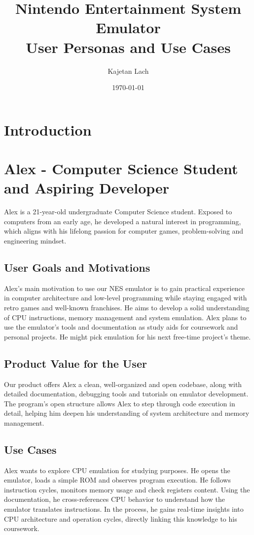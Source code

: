 \documentclass[a4paper, 11pt]{article}
\title{%
\vspace{-2.5cm}
\textbf{Nintendo Entertainment System Emulator}\\
User Personas and Use Cases
}
\date{\today}
\author{Kajetan Lach}
\begin{document}
\maketitle

\section{Introduction}

\section{Alex - Computer Science Student and Aspiring Developer}
Alex is a 21-year-old undergraduate Computer Science student. Exposed to computers from an early age, he developed a natural interest in programming, which aligns with his lifelong passion for computer games, problem-solving and engineering mindset.

\subsection{User Goals and Motivations}
Alex's main motivation to use our NES emulator is to gain practical experience in computer architecture and low-level programming while staying engaged with retro games and well-known franchises. He aims to develop a solid understanding of CPU instructions, memory management and system emulation. Alex plans to use the emulator's tools and documentation as study aids for coursework and personal projects. He might pick emulation for his next free-time project's theme.

\subsection{Product Value for the User}
Our product offers Alex a clean, well-organized and open codebase, along with detailed documentation, debugging tools and tutorials on emulator development. The program's open structure allows Alex to step through code execution in detail, helping him deepen his understanding of system architecture and memory management.

\subsection{Use Cases}
Alex wants to explore CPU emulation for studying purposes. He opens the emulator, loads a simple ROM and observes program execution. He follows instruction cycles, monitors memory usage and check registers content. Using the documentation, he cross-references CPU behavior to understand how the emulator translates instructions. In the process, he gains real-time insights into CPU architecture and operation cycles, directly linking this knowledge to his coursework.
\end{document}
